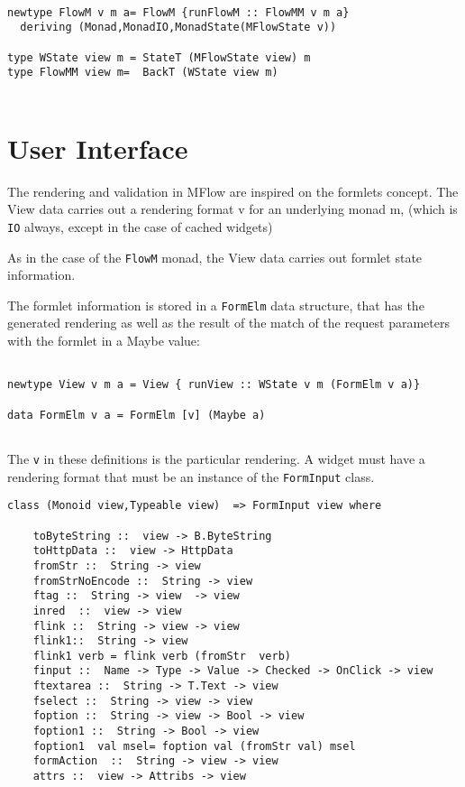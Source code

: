 \documentclass{tmr}
\begin{document}
{\tt 
 
\begin{verbatim} 
 
newtype FlowM v m a= FlowM {runFlowM :: FlowMM v m a} 
  deriving (Monad,MonadIO,MonadState(MFlowState v)) 
 
type WState view m = StateT (MFlowState view) m 
type FlowMM view m=  BackT (WState view m) 
 
\end{verbatim} 
 
} 
 
\section{User Interface} 
The rendering and validation in MFlow are inspired on the  formlets\cite{auth:formlets} concept. The View  data carries out a rendering format v for an underlying monad m, (which is {\tt IO} always, except in the case of cached widgets) 
 
As in the case of the {\tt FlowM} monad, the View data carries out  formlet state information. 
 
The formlet information is stored in a {\tt FormElm} data structure, that has the generated rendering as well as the result of the match of the request parameters with the formlet in a Maybe value: 
{\tt 
 
\begin{verbatim} 
 
newtype View v m a = View { runView :: WState v m (FormElm v a)} 
 
data FormElm v a = FormElm [v] (Maybe a) 
 
\end{verbatim} 
 
} 
The {\tt v} in these definitions is the particular rendering.  A widget must have a rendering format that must be an instance of the {\tt FormInput} class. 
 
{\tt 
 
\begin{verbatim} 
class (Monoid view,Typeable view)  => FormInput view where 
 
    toByteString ::  view -> B.ByteString 
    toHttpData ::  view -> HttpData 
    fromStr ::  String -> view 
    fromStrNoEncode ::  String -> view 
    ftag ::  String -> view  -> view 
    inred  ::  view -> view 
    flink ::  String -> view -> view 
    flink1::  String -> view 
    flink1 verb = flink verb (fromStr  verb) 
    finput ::  Name -> Type -> Value -> Checked -> OnClick -> view 
    ftextarea ::  String -> T.Text -> view 
    fselect ::  String -> view -> view 
    foption ::  String -> view -> Bool -> view 
    foption1 ::  String -> Bool -> view 
    foption1  val msel= foption val (fromStr val) msel 
    formAction  ::  String -> view -> view 
    attrs ::  view -> Attribs -> view 
 
 
\end{verbatim} 
 
} 
 
\end{document}

